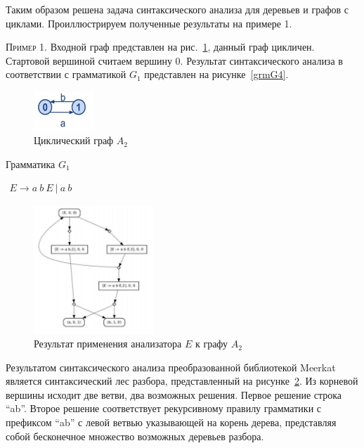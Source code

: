 Таким образом решена задача синтаксического анализа для деревьев и графов с циклами. Проиллюстрируем полученные результаты на примере 1.

\textsc{Пример 1.} 
Входной граф представлен на рис.~\ref{Graph2}, данный граф цикличен. Стартовой вершиной считаем вершину 0. Результат синтаксического анализа в соответствии с грамматикой $G_1$ представлен на рисунке~\ref{grmG4}.

\begin{figure}
 \centering
 \includegraphics[width=0.2\textwidth]{Smolina/pics/Graph2.png}
 \caption{Циклический граф $A_2$}
 \label{Graph2}
\end{figure}

\begin{listing}
\caption{Грамматика $G_1$}
\label{grmG4}
\centering
$\begin{array}{rl}
E \rightarrow a \ b \ E \ | \ a \ b
\end{array}$
 \end{listing}

\begin{figure}
 \centering
 \includegraphics[width=0.4\textwidth]{Smolina/pics/Tree1.png}
 \caption{Результат применения анализатора $E$ к графу $A_2$}
 \label{Tree1}
\end{figure}

Результатом синтаксического анализа преобразованной библиотекой Meerkat является синтаксический лес разбора, представленный на рисунке~\ref{Tree1}. Из корневой вершины исходит две ветви, два возможных решения. Первое решение строка ``ab''. Второе решение соответствует рекурсивному правилу грамматики с префиксом ``ab'' с левой ветвью указывающей на корень дерева, представляя собой бесконечное множество возможных деревьев разбора.

